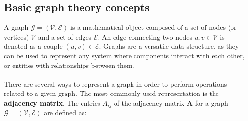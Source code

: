 \documentclass[12pt, oneside]{report}   	%
\begin{document}
\subsection{Basic graph theory concepts}

A graph $\mathcal{G}=(\mathcal{V}, \mathcal{E})$ is a mathematical object composed of a set of nodes (or vertices) $\mathcal{V}$ and a set of edges $\mathcal{E}$. An edge connecting two nodes $u,v\in\mathcal{V}$ is denoted as a couple $(u,v)\in\mathcal{E}$. Graphs are a versatile data structure, as they can be used to represent any system where components interact with each other, or entities with relationships between them.\\\\
There are several ways to represent a graph in order to perform operations related to a given graph. The most commonly used representation is the \textbf{adjacency matrix}. The entries $A_{ij}$ of the adjacency matrix $\boldsymbol{A}$ for a graph $\mathcal{G}=(\mathcal{V}, \mathcal{E})$ are defined as:
\end{document}
